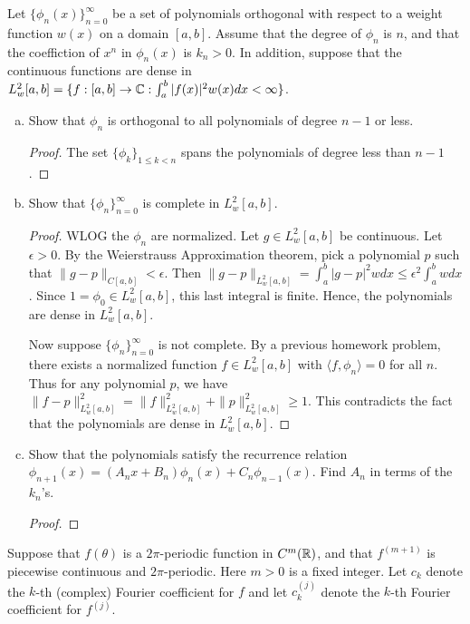 \documentclass{article}
\begin{document}
  
  Let $\{\phi_n(x)\}_{n=0}^\infty$ be a set of polynomials orthogonal with respect to a weight function $w(x)$ on a domain $[a,b]$. Assume that the degree of $\phi_n$ is $n$, and that the coeffiction of $x^n$ in $\phi_n(x)$ is $k_n > 0$. In addition, suppose that the continuous functions are dense in $L_w^2[a,b] = \{f : [a,b] \to \mathbb{C} : \int_a^b |f(x)|^2 w(x) dx < \infty \}$.

\begin{enumerate}[(a)]
\item Show that $\phi_n$ is orthogonal to all polynomials of degree $n - 1$ or less.
\begin{proof}
The set $\{\phi_k\}_{1 \le k < n}$ spans the polynomials of degree less than $n-1$.
\end{proof}
\item Show that $\{ \phi_n \}_{n=0}^\infty$ is complete in $L_w^2[a,b]$.
\begin{proof}
WLOG the $\phi_n$ are normalized.  Let $g \in L_w^2[a,b]$ be continuous.  Let $\epsilon > 0$.  By the Weierstrauss Approximation theorem, pick a polynomial $p$ such that $\|g - p \|_{C[a,b]} < \epsilon$.  Then
$\|g - p\|_{L_w^2[a,b]} = \int_a^b |g - p|^2 w dx \le \epsilon^2 \int_a^b w dx$.  Since $1 = \phi_0 \in L_w^2[a,b]$, this last integral is finite.  Hence, the polynomials are dense in $L_w^2[a,b]$.

Now suppose $\{ \phi_n \}_{n=0}^\infty$ is not complete. By a previous homework problem, there exists a normalized function $f \in L_w^2[a,b]$ with $\langle f, \phi_n \rangle = 0$ for all $n$.  Thus for any polynomial $p$, we have $\|f - p\|_{L_w^2[a,b]}^2 = \|f\|_{L_w^2[a,b]}^2 + \|p\|_{L_w^2[a,b]}^2 \ge 1$.  This contradicts the fact that the polynomials are dense in ${L_w^2[a,b]}$.

\end{proof}
\item Show that the polynomials satisfy the recurrence relation $\phi_{n+1}(x) = (A_nx + B_n) \phi_n(x) + C_n \phi_{n-1}(x)$. Find $A_n$ in terms of the $k_n$'s.  
\begin{proof}

\end{proof}
\end{enumerate}


 Suppose that $f(\theta)$ is a $2 \pi$-periodic function in $C^m( \mathbb{R})$, and that $f^{(m+1)}$ is piecewise continuous and $2 \pi$-periodic. Here $m > 0$ is a fixed integer.  Let $c_k$ denote the $k$-th (complex) Fourier coefficient for $f$ and let $c_k^{(j)}$ denote the $k$-th Fourier coefficient for $f^{(j)}$.
\end{document}

